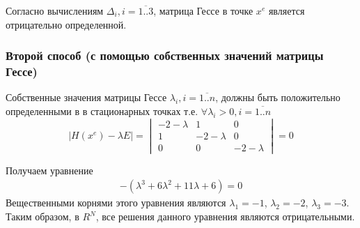         Согласно вычислениям $\Delta_i, i=\overline{1..3}$, матрица Гессе в точке $x^e$ является отрицательно определенной.
    
    \subsubsection{Второй способ (с помощью собственных значений матрицы Гессе)}
        Собственные значения матрицы Гессе $\lambda_i, i = \overline{1..n}$, должны быть положительно определенными в в стационарных точках
        т.е. $\forall \lambda_i > 0, i = \overline{1..n} $
        \[
        |H(x^e) - \lambda E| =  
        \begin{vmatrix}
            -2 - \lambda & 1 & 0 \\
            1 & -2 - \lambda & 0 \\
            0 & 0 & -2 - \lambda
        \end{vmatrix} = 0
        \]
        
        Получаем уравнение
        \begin{gather}
            -(\lambda^3 + 6\lambda^2 + 11\lambda + 6) = 0 \nonumber
        \end{gather}
        Вещественными корнями этого уравнения являются $\lambda_1 = -1$, $\lambda_2 = -2$, $\lambda_3 = -3$. Таким образом, в $R^N$, все решения данного уравнения являются отрицательными.